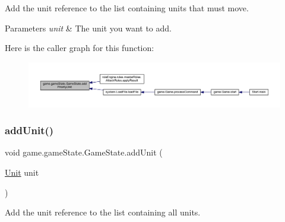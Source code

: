 Add the unit reference to the list containing units that must move.


\begin{DoxyParams}{Parameters}
{\em unit} & The unit you want to add. \\
\hline
\end{DoxyParams}
Here is the caller graph for this function\+:
\nopagebreak
\begin{figure}[H]
\begin{center}
\leavevmode
\includegraphics[width=350pt]{classgame_1_1game_state_1_1_game_state_a3fbe9f547d5175914f4785a40d1871ad_icgraph}
\end{center}
\end{figure}
\mbox{\label{classgame_1_1game_state_1_1_game_state_a1e0ecf6737cb33799a09b30eb5f81431}} 
\subsubsection{\texorpdfstring{add\+Unit()}{addUnit()}}
{\footnotesize\ttfamily void game.\+game\+State.\+Game\+State.\+add\+Unit (\begin{DoxyParamCaption}\item[{\mbox{\hyperlink{classgame_1_1board_1_1_unit}{Unit}}}]{unit }\end{DoxyParamCaption})\hspace{0.3cm}{\ttfamily [inline]}}

Add the unit reference to the list containing all units.


